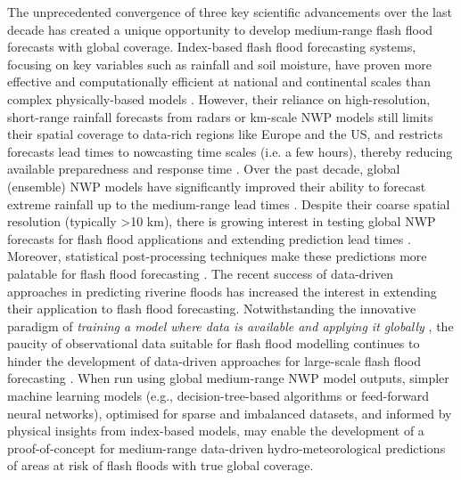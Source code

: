 The  unprecedented convergence of three key scientific advancements over the last decade has created a unique opportunity to develop medium-range flash flood forecasts with global coverage. Index-based flash flood forecasting systems, focusing on key variables such as rainfall and soil moisture, have proven more effective and computationally efficient at national and continental scales than complex physically-based models \citep{Alfieri_2015a}. However, their reliance on high-resolution, short-range rainfall forecasts from radars or km-scale NWP models still limits their spatial coverage to data-rich regions like Europe and the US, and restricts forecasts lead times to nowcasting time scales (i.e. a few hours), thereby reducing available preparedness and response time \citep{Luong_2021, Maybee_2024}. Over the past decade, global (ensemble) NWP models have significantly improved their ability to forecast extreme rainfall up to the medium-range lead times \citep{Lavers_2021, Haiden_2023}. Despite their coarse spatial resolution (typically >10 km), there is growing interest in testing global NWP forecasts for flash flood applications and extending prediction lead times \citep{Bucherie_2022b}. Moreover, statistical post-processing techniques make these predictions more palatable for flash flood forecasting \citep{Vannitsem_2021}. The recent success of data-driven approaches in predicting riverine floods \citep{Nearing_2024} has increased the interest in extending their application to flash flood forecasting. Notwithstanding the innovative paradigm of \textit{training a model where data is available and applying it globally} \citep{Kratzert_2024}, the paucity of observational data suitable for flash flood modelling continues to hinder the development of data-driven approaches for large-scale flash flood forecasting \citep{Alzubaidi_2023}. When run using global medium-range NWP model outputs, simpler machine learning models (e.g., decision-tree-based algorithms or feed-forward neural networks), optimised for sparse and imbalanced datasets, and informed by physical insights from index-based models, may enable the development of a proof-of-concept for medium-range data-driven hydro-meteorological predictions of areas at risk of flash floods with true global coverage.


